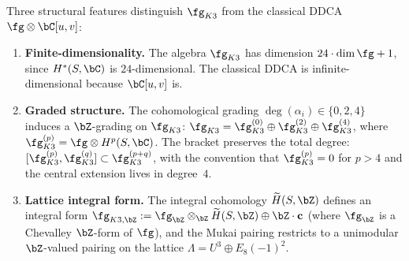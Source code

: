 Three structural features distinguish $\fg_{K3}$ from the classical DDCA
$\fg \otimes \bC[u,v]$:

\begin{enumerate}[label=(\roman*)]
\item \textbf{Finite-dimensionality.}
 The algebra $\fg_{K3}$ has dimension $24 \cdot \dim\fg + 1$, since
 $H^*(S,\bC)$ is $24$-dimensional. The classical DDCA is
 infinite-dimensional because $\bC[u,v]$ is.

\item \textbf{Graded structure.}
 The cohomological grading $\deg(\alpha_i) \in \{0, 2, 4\}$ induces a
 $\bZ$-grading on $\fg_{K3}$:
 $\fg_{K3} = \fg_{K3}^{(0)} \oplus \fg_{K3}^{(2)} \oplus \fg_{K3}^{(4)}$,
 where $\fg_{K3}^{(p)} = \fg \otimes H^p(S, \bC)$.
 The bracket preserves the total degree:
 $[\fg_{K3}^{(p)}, \fg_{K3}^{(q)}] \subset \fg_{K3}^{(p+q)}$,
 with the convention that $\fg_{K3}^{(p)} = 0$ for $p > 4$ and the
 central extension lives in degree~$4$.

\item \textbf{Lattice integral form.}
 The integral cohomology $\widetilde{H}(S, \bZ)$ defines an integral
 form $\fg_{K3,\bZ} := \fg_\bZ \otimes_\bZ \widetilde{H}(S, \bZ) \oplus \bZ \cdot \mathbf{c}$
 (where $\fg_\bZ$ is a Chevalley $\bZ$-form of $\fg$), and the Mukai
 pairing restricts to a unimodular $\bZ$-valued pairing on the lattice
 $\Lambda = U^3 \oplus E_8(-1)^2$.
\end{enumerate}

